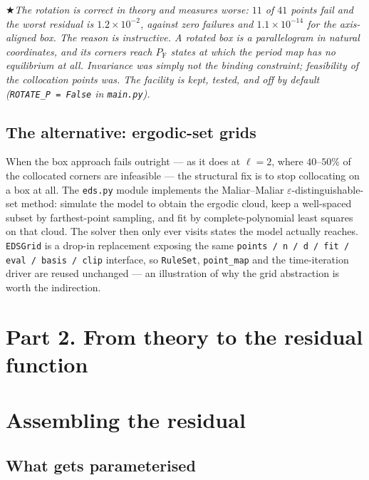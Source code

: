\documentclass[11pt]{article}
\numberwithin{equation}{section}
\newcommand{\code}[1]{\texttt{\small #1}}
\newcommand{\F}{\mathrm{F}}
\theoremstyle{definition}
\theoremstyle{plain}
\theoremstyle{remark}
\newcommand{\warn}[1]{\par\smallskip\noindent
  \textcolor{red!60!black}{$\bigstar$}\;\emph{#1}\par\smallskip}
\begin{document}
\warn{The rotation is correct in theory and \emph{measures worse}: $11$ of $41$
points fail and the worst residual is $1.2\times10^{-2}$, against zero failures and
$1.1\times10^{-14}$ for the axis-aligned box. The reason is instructive. A rotated
box is a parallelogram in natural coordinates, and its corners reach $P_\F$ states at
which the period map has no equilibrium at all. Invariance was simply not the binding
constraint; \emph{feasibility of the collocation points} was. The facility is kept,
tested, and off by default (\code{ROTATE\_P = False} in \code{main.py}).}

\subsection{The alternative: ergodic-set grids}

When the box approach fails outright --- as it does at $\ell=2$, where $40$--$50\%$ of
the collocated corners are infeasible --- the structural fix is to stop collocating on
a box at all. The \code{eds.py} module implements the Maliar--Maliar
$\varepsilon$-distinguishable-set method: simulate the model to obtain the ergodic
cloud, keep a well-spaced subset by farthest-point sampling, and fit by
complete-polynomial least squares on that cloud. The solver then only ever visits
states the model actually reaches. \code{EDSGrid} is a drop-in replacement exposing
the same \code{points / n / d / fit / eval / basis / clip} interface, so
\code{RuleSet}, \code{point\_map} and the time-iteration driver are reused unchanged
--- an illustration of why the grid abstraction is worth the indirection.

\clearpage
\section*{Part 2. From theory to the residual function}

\section{Assembling the residual}
\label{sec:residual}

\subsection{What gets parameterised}
\end{document}
